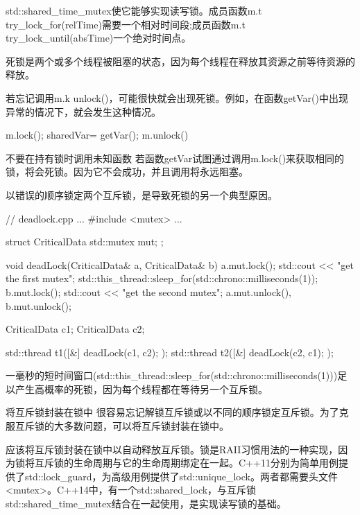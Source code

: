 std::shared\_time\_mutex使它能够实现读写锁。成员函数m.t try\_lock\_for(relTime)需要一个相对时间段;成员函数m.t try\_lock\_until(absTime)一个绝对时间点。



死锁是两个或多个线程被阻塞的状态，因为每个线程在释放其资源之前等待资源的释放。

若忘记调用m.k unlock()，可能很快就会出现死锁。例如，在函数getVar()中出现异常的情况下，就会发生这种情况。

\begin{cpp}
m.lock();
sharedVar= getVar();
m.unlock()
\end{cpp}

\begin{myWarning}{不要在持有锁时调用未知函数}
若函数getVar试图通过调用m.lock()来获取相同的锁，将会死锁。因为它不会成功，并且调用将永远阻塞。
\end{myWarning}

以错误的顺序锁定两个互斥锁，是导致死锁的另一个典型原因。


\begin{cpp}
// deadlock.cpp
...
#include <mutex>
...

struct CriticalData{
	std::mutex mut;
};

void deadLock(CriticalData& a, CriticalData& b){
	a.mut.lock();
	std::cout << "get the first mutex\n";
	std::this_thread::sleep_for(std::chrono::milliseconds(1));
	b.mut.lock();
	std::cout << "get the second mutex\n";
	a.mut.unlock(), b.mut.unlock();
}

CriticalData c1;
CriticalData c2;

std::thread t1([&]{ deadLock(c1, c2); });
std::thread t2([&]{ deadLock(c2, c1); });
\end{cpp}

一毫秒的短时间窗口(std::this\_thread::sleep\_for(std::chrono::milliseconds(1)))足以产生高概率的死锁，因为每个线程都在等待另一个互斥锁。


\begin{myTip}{将互斥锁封装在锁中}
很容易忘记解锁互斥锁或以不同的顺序锁定互斥锁。为了克服互斥锁的大多数问题，可以将互斥锁封装在锁中。
\end{myTip}


应该将互斥锁封装在锁中以自动释放互斥锁。锁是RAII习惯用法的一种实现，因为锁将互斥锁的生命周期与它的生命周期绑定在一起。C++11分别为简单用例提供了std::lock\_guard，为高级用例提供了std::unique\_lock。两者都需要头文件<mutex>。C++14中，有一个std::shared\_lock，与互斥锁std::shared\_time\_mutex结合在一起使用，是实现读写锁的基础。

